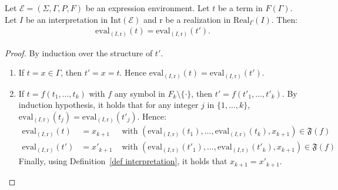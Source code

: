 \documentclass[a4paper]{llncs}
\begin{document}
  \begin{proposition}\label{prop t tprim mem eval}
    Let $\mathcal{E}=(\Sigma,\Gamma,P,F)$ be an expression environment. Let $t$ be a term in $F(\Gamma)$. Let $I$ be an interpretation in $\mathrm{Int}(\mathcal{E})$ and $\mathrm{r}$ be a realization in $\mathrm{Real}_\Gamma(I)$. Then:
        \begin{align*}
      \mathrm{eval}_{(I,\mathrm{r})}(t)=\mathrm{eval}_{(I,\mathrm{r})}(t').
        \end{align*}
  \end{proposition}
  \begin{proof}
    By induction over the structure of $t'$.
    \begin{enumerate}
      \item If $t=x\in\Gamma$, then $t'=x=t$. Hence $\mathrm{eval}_{(I,\mathrm{r})}(t)=\mathrm{eval}_{(I,\mathrm{r})}(t')$.    
      \item If $t=f(t_1,\ldots,t_k)$ with $f$ any symbol in $F_k\setminus\{\cdot\}$, then $t'=f(t'_1,\ldots,t'_k)$. By induction hypothesis, it holds that for any integer $j$ in $\{1,\ldots,k\}$, $\mathrm{eval}_{(I,\mathrm{r})}(t_j)=\mathrm{eval}_{(I,\mathrm{r})}(t'_j)$. Hence:
        \begin{align*}
          \mathrm{eval}_{(I,\mathrm{r})}(t)& =x_{k+1} & \text{ with }(\mathrm{eval}_{(I,\mathrm{r})}(t_1),\ldots,\mathrm{eval}_{(I,\mathrm{r})}(t_k),x_{k+1})\in\mathfrak{F}(f)\\
          \mathrm{eval}_{(I,\mathrm{r})}(t')&=x'_{k+1} & \text{ with }(\mathrm{eval}_{(I,\mathrm{r})}(t'_1),\ldots,\mathrm{eval}_{(I,\mathrm{r})}(t'_k),x_{k+1})\in\mathfrak{F}(f)
        \end{align*}    
    Finally, using Definition~\ref{def interpretation}, it holds that $x_{k+1}=x'_{k+1}$.
    

\end{enumerate}
\end{proof}
\end{document}
